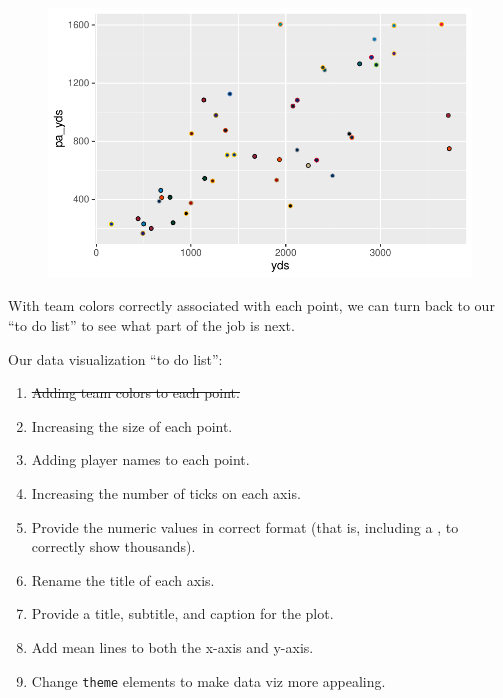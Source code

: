 \documentclass[
  letterpaper,
]{krantz}
\begin{document}
\begin{figure}[H]

{\centering \includegraphics{04-nfl-analytics-visualization_files/figure-pdf/adding-shape-21-to-plot-1.pdf}

}

\end{figure}

With team colors correctly associated with each point, we can turn back
to our ``to do list'' to see what part of the job is next.

\begin{tcolorbox}[enhanced jigsaw, colback=white, leftrule=.75mm, breakable, colframe=quarto-callout-note-color-frame, bottomtitle=1mm, rightrule=.15mm, left=2mm, opacityback=0, bottomrule=.15mm, arc=.35mm, coltitle=black, colbacktitle=quarto-callout-note-color!10!white, toptitle=1mm, titlerule=0mm, title=\textcolor{quarto-callout-note-color}{\faInfo}\hspace{0.5em}{Note}, toprule=.15mm, opacitybacktitle=0.6]

Our data visualization ``to do list'':

\begin{enumerate}
\def\labelenumi{\arabic{enumi}.}
\item
  \st{Adding team colors to each point.}
\item
  Increasing the size of each point.
\item
  Adding player names to each point.
\item
  Increasing the number of ticks on each axis.
\item
  Provide the numeric values in correct format (that is, including a ,
  to correctly show thousands).
\item
  Rename the title of each axis.
\item
  Provide a title, subtitle, and caption for the plot.
\item
  Add mean lines to both the x-axis and y-axis.
\item
  Change \texttt{theme} elements to make data viz more appealing.
\end{enumerate}

\end{tcolorbox}
\end{document}
